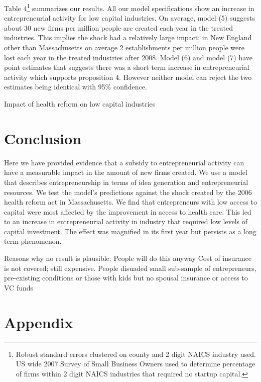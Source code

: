 \documentclass[12pt]{article}
\begin{document}
Table 4\footnote{Robust standard errors clustered on county and 2 digit NAICS industry used. US wide 2007 Survey of Small Business Owners used to determine percentage of firms within 2 digit NAICS industries that required no startup capital.} summarizes our results. All our model specifications show an increase in entrepreneurial activity for low capital industries. On average, model (5) suggests about 30 new firms per million people are created each year in the treated industries. This implies the shock had a relatively large impact; in New England other than Massachusetts on average 2 establishments per million people were lost each year in the treated industries after 2008. Model (6) and model (7) have point estimates that suggests there was a short term increase in entrepreneurial activity which supports proposition 4. However neither model can reject the two estimates being identical with 95\% confidence. 
\begin{center}
	\begin{table}[H]
		\centering
		
		\caption{Impact of health reform on low capital industries}
	\end{table}
\end{center}

\section*{Conclusion}
Here we have provided evidence that a subsidy to entrepreneurial activity can have a measurable impact in the amount of new firms created. We use a model that describes entrepreneurship in terms of idea generation and entrepreneurial resources. We test the model's predictions against the shock created by the 2006 health reform act in Massachusetts. We find that entrepreneurs with low access to capital were most affected by the improvement in access to health care. This led to an increase in entrepreneurial activity in industry that required low levels of capital investment. The effect was magnified in its first year but persists as a long term phenomenon. 

Reasons why no result is plausible: 
People will do this anyway
Cost of insurance is not covered; still expensive. 
People disuaded small sub-sample of entrepreneurs, pre-existing conditions or those with kids but no spousal insurance or access to VC funds

\appendix
\section*{Appendix}
\end{document}
